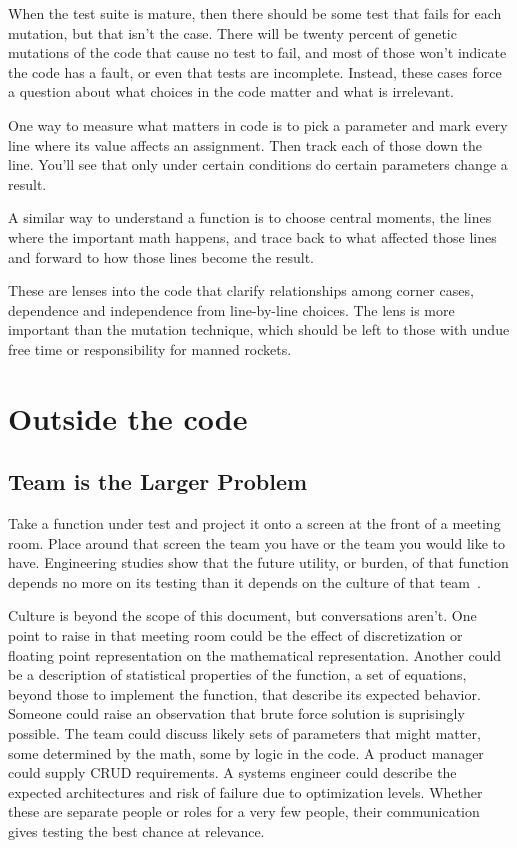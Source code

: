 \documentclass[fleqn,10pt]{olplainarticle}
\begin{document}
When the test suite is mature, then there should be some test
that fails for each mutation, but that isn't the case. There
will be twenty percent of genetic mutations of the code that
cause no test to fail, and most of those won't indicate the
code has a fault, or even that tests are incomplete. Instead,
these cases force a question about what choices in the code
matter and what is irrelevant.

One way to measure what matters in code is to pick a
parameter and mark every line where its value affects
an assignment. Then track each of those down the line.
You'll see that only under certain conditions do certain
parameters change a result.

A similar way to understand a function is to choose central
moments, the lines where the important math happens, and
trace back to what affected those lines and forward to
how those lines become the result.

These are lenses into the code that clarify relationships
among corner cases, dependence and independence from
line-by-line choices. The lens is more important than the
mutation technique, which should be left to those with
undue free time or responsibility for manned rockets.


\section{Outside the code}

\subsection{Team is the Larger Problem}

Take a function under test and project it onto a
screen at the front of a meeting room. Place around that screen
the team you have or the team you would like to have.
Engineering studies show that the future utility, or burden,
of that function depends no more on its testing than it
depends on the culture of that team~\citep{neumann2016,kanewala2014}.

Culture is beyond the scope of this document, but conversations
aren't. One point to raise in that meeting room could
be the effect of discretization or floating point representation
on the mathematical representation. Another could be a
description of statistical properties of the function, a set
of equations, beyond those to implement the function, that
describe its expected behavior. Someone could raise an observation
that brute force solution is suprisingly possible.
The team could discuss likely sets of parameters that might
matter, some determined by the math, some by logic in the
code. A product manager could supply CRUD requirements.
A systems engineer could describe the expected architectures
and risk of failure due to optimization levels. Whether these
are separate people or roles for a very few people, their
communication gives testing the best chance at relevance.
\end{document}
